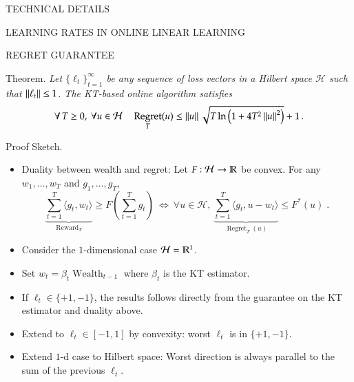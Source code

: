 \documentclass[final,t,serif,mathserif]{beamer}
\DeclareMathOperator{\Wealth}{Wealth}
\renewcommand{\H}{\mathcal{H}}  %
\DeclareMathOperator{\Regret}{Regret}
\DeclareMathOperator{\Reward}{Reward}
\def\blockspacec{\vspace{-0.08cm}}
\begin{document}
\begin{frame}{}
\begin{columns}[t]
\begin{column}{.33\linewidth}
\begin{block}{TECHNICAL DETAILS}
\begin{minipage}{.98\linewidth}
\begin{block}{LEARNING RATES IN ONLINE LINEAR LEARNING}
    \blockspacec
    \end{block}

    \begin{block}{REGRET GUARANTEE}
    \blockspacec
    
    \alert{Theorem.} \emph{
	Let $\{\ell_t\}_{t=1}^\infty$ be any sequence of loss vectors
	in a Hilbert space $\H$ such that $\left\|{\ell_t}\right\| \le 1$.
	The KT-based online algorithm satisfies
	$$
	\forall \, T \ge 0, \
	\forall u \in \H \quad
	\Regret_T(u) \le \norm{u} \sqrt{T \ln\left(1 + 4T^2 \norm{u}^2 \right)} + 1 \, .
	$$
    }

    \vspace{.5cm}

    \alert{Proof Sketch.}
    \begin{itemize}
    \item Duality between wealth and regret: Let $F:\H \to \R$ be convex. For any $w_1, \dots, w_T$ and $g_1, \dots, g_T$,
    \[
      \underbrace{\sum_{t=1}^T \langle g_t, w_t \rangle}_{\Reward_T} \ge F\left( \sum_{t=1}^T g_t \right)
      \ \Leftrightarrow \
      \forall u \in \H, \
      \underbrace{\sum_{t=1}^T \langle g_t, u - w_t\rangle}_{\Regret_T(u)} \le F^*(u) \; .
    \]
    \item Consider the $1$-dimensional case $\H=\R^1$.
    \item Set $w_t=\beta_t \Wealth_{t-1}$ where $\beta_t$ is the KT estimator.
    \item If $\ell_t \in \{+1, -1\}$, the results follows directly from the guarantee on the KT estimator and duality above.
    \item Extend to $\ell_t \in [-1,1]$ by convexity: worst $\ell_t$ is in $\{+1,-1\}$.
    \item Extend $1$-d case to Hilbert space: Worst direction is always parallel to the sum of the previous $\ell_t$.
    \end{itemize}
    \end{block}
    \end{minipage}
    \blockspacec
    \end{block}
\end{column}


\end{columns}
\end{frame}
\end{document}
